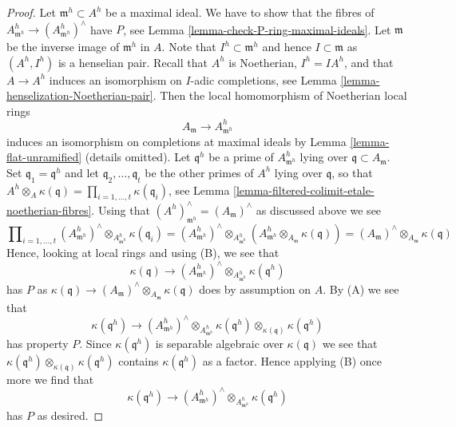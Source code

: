 \begin{proof}
Let $\mathfrak m^h \subset A^h$ be a maximal ideal. We have to show
that the fibres of $A^h_{\mathfrak m^h} \to (A^h_{\mathfrak m^h})^\wedge$
have $P$, see Lemma \ref{lemma-check-P-ring-maximal-ideals}.
Let $\mathfrak m$ be the inverse image of $\mathfrak m^h$ in $A$.
Note that $I^h \subset \mathfrak m^h$ and hence $I \subset \mathfrak m$
as $(A^h, I^h)$ is a henselian pair. Recall that $A^h$ is Noetherian,
$I^h = IA^h$, and that $A \to A^h$ induces an isomorphism on
$I$-adic completions, see
Lemma \ref{lemma-henselization-Noetherian-pair}.
Then the local homomorphism of Noetherian local rings
$$
A_\mathfrak m \to A^h_{\mathfrak m^h}
$$
induces an isomorphism on completions at maximal ideals by
Lemma \ref{lemma-flat-unramified} (details omitted).
Let $\mathfrak q^h$ be a prime of $A^h_{\mathfrak m^h}$ lying
over $\mathfrak q \subset A_\mathfrak m$.
Set $\mathfrak q_1 = \mathfrak q^h$
and let $\mathfrak q_2, \ldots, \mathfrak q_t$
be the other primes of $A^h$ lying over $\mathfrak q$, so that
$A^h \otimes_A \kappa(\mathfrak q) =
\prod\nolimits_{i = 1, \ldots, t} \kappa(\mathfrak q_i)$, see
Lemma \ref{lemma-filtered-colimit-etale-noetherian-fibres}.
Using that $(A^h)_{\mathfrak m^h}^\wedge = (A_\mathfrak m)^\wedge$
as discussed above we see
$$
\prod\nolimits_{i = 1, \ldots, t}
(A^h_{\mathfrak m^h})^\wedge \otimes_{A^h_{\mathfrak m^h}}
\kappa(\mathfrak q_i) =
(A^h_{\mathfrak m^h})^\wedge \otimes_{A^h_{\mathfrak m^h}}
(A^h_{\mathfrak m^h} \otimes_{A_{\mathfrak m}} \kappa(\mathfrak q)) =
(A_{\mathfrak m})^\wedge \otimes_{A_{\mathfrak m}} \kappa(\mathfrak q)
$$
Hence, looking at local rings and using (B), we see that
$$
\kappa(\mathfrak q) \longrightarrow
(A^h_{\mathfrak m^h})^\wedge \otimes_{A^h_{\mathfrak m^h}}
\kappa(\mathfrak q^h)
$$
has $P$ as
$\kappa(\mathfrak q) \to
(A_\mathfrak m)^\wedge \otimes_{A_\mathfrak m} \kappa(\mathfrak q)$
does by assumption on $A$. By (A) we see that
$$
\kappa(\mathfrak q^h) \longrightarrow
(A^h_{\mathfrak m^h})^\wedge \otimes_{A^h_{\mathfrak m^h}}
\kappa(\mathfrak q^h) \otimes_{\kappa(\mathfrak q)} \kappa(\mathfrak q^h)
$$
has property $P$. Since $\kappa(\mathfrak q^h)$ is separable algebraic over
$\kappa(\mathfrak q)$ we see that
$\kappa(\mathfrak q^h) \otimes_{\kappa(\mathfrak q)} \kappa(\mathfrak q^h)$
contains $\kappa(\mathfrak q^h)$ as a factor. Hence applying (B)
once more we find that
$$
\kappa(\mathfrak q^h) \to
(A^h_{\mathfrak m^h})^\wedge \otimes_{A^h_{\mathfrak m^h}}
\kappa(\mathfrak q^h)
$$
has $P$ as desired.
\end{proof}

